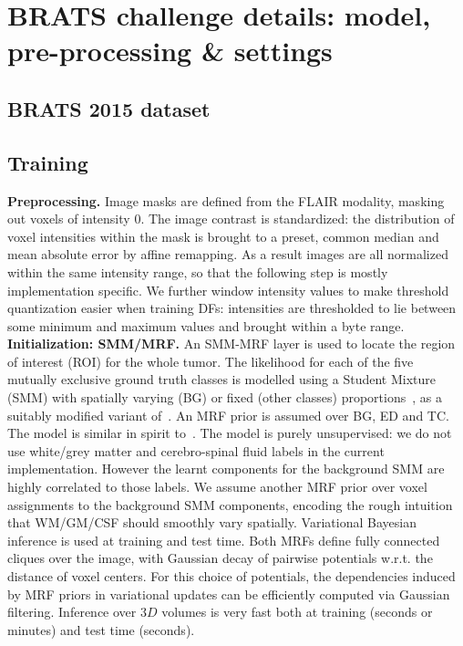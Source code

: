 
\section{BRATS challenge details: model, pre-processing \& settings}

\subsection{BRATS 2015 dataset}

\subsection{Training}

\noindent
\textbf{Preprocessing.} Image masks are defined from the FLAIR modality, masking out voxels of intensity $0$. The image contrast is standardized: the distribution of voxel intensities within the mask is brought to a preset, common median and mean absolute error by affine remapping. As a result images are all normalized within the same intensity range, so that the following step is mostly implementation specific. We further window intensity values to make threshold quantization easier when training DFs: intensities are thresholded to lie between some minimum and maximum values and brought within a byte range.\\

\noindent
\textbf{Initialization: SMM/MRF.} An SMM-MRF layer is used to locate the region of interest (ROI) for the whole tumor. The likelihood for each of the five mutually exclusive ground truth classes is modelled using a Student Mixture (SMM) with spatially varying (BG) or fixed (other classes) proportions~\cite{archambeau2007robust}, as a suitably modified variant of~\cite{cordier2015patch}. An MRF prior is assumed over BG, ED and TC. The model is similar in spirit to~\cite{zhang2001segmentation,menze2010generative}. The model is purely unsupervised: we do not use white/grey matter and cerebro-spinal fluid labels in the current implementation. However the learnt components for the background SMM are highly correlated to those labels. We assume another MRF prior over voxel assignments to the background SMM components, encoding the rough intuition that WM/GM/CSF should smoothly vary spatially. Variational Bayesian inference is used at training and test time. Both MRFs define fully connected cliques over the image, with Gaussian decay of pairwise potentials w.r.t. the distance of voxel centers. For this choice of potentials, the dependencies induced by MRF priors in variational updates can be efficiently computed via Gaussian filtering. Inference over $3D$ volumes is very fast both at training (seconds or minutes) and test time (seconds).\\

